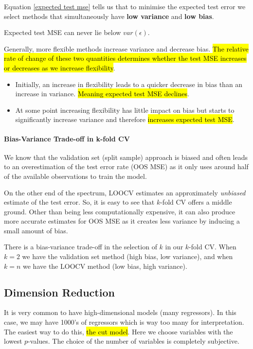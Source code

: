\documentclass[11pt]{article}
\begin{document}
Equation \eqref{expected test mse} tells us that to minimise the expected test error we select methods that simultaneously have \textbf{low variance} and \textbf{low bias}.

\begin{note}
    Expected test MSE can never lie below $var(\epsilon)$.
\end{note}

Generally, more flexible methods increase variance and decrease bias. \hl{The relative rate of change of these two quantities determines whether the test MSE increases or decreases as we increase flexibility}.
\begin{itemize}
    \item Initially, an increase in flexibility leads to a quicker decrease in bias than an increase in variance. \hl{Meaning expected test MSE declines}.
    \item At some point increasing flexibility has little impact on bias but starts to significantly increase variance and therefore \hl{increases expected test MSE}.
\end{itemize}

\paragraph{Bias-Variance Trade-off in k-fold CV}

 We know that the validation set (split sample) approach is biased and often leads to an overestimation of the test error rate (OOS MSE) as it only uses around half of the available observations to train the model.

On the other end of the spectrum, LOOCV estimates an approximately \textit{unbiased} estimate of the test error. So, it is easy to see that $k$-fold CV offers a middle ground. Other than being less computationally expensive, it can also produce more accurate estimates for OOS MSE as it creates less variance by inducing a small amount of bias.

There is a bias-variance trade-off in the selection of $k$ in our $k$-fold CV. When $k=2$ we have the validation set method (high bias, low variance), and when $k=n$ we have the LOOCV method (low bias, high variance). 
\subsection{Dimension Reduction}

It is very common to have high-dimensional models (many regressors). In this case, we may have 1000's of regressors which is way too many for interpretation. The easiest way to do this, \hl{the cut model}. Here we choose variables with the lowest $p$-values. The choice of the number of variables is completely subjective.
\end{document}
